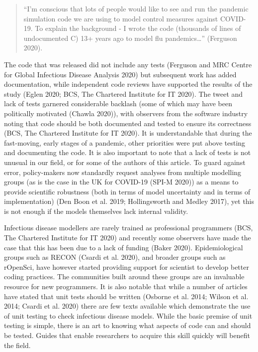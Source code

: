 \documentclass[
]{article}
\begin{document}
\begin{quote}
``I'm conscious that lots of people would like to see and run the pandemic simulation code we are using to model control measures against COVID-19. To explain the background - I wrote the code (thousands of lines of undocumented C) 13+ years ago to model flu pandemics\ldots{}'' (Ferguson 2020).
\end{quote}

The code that was released did not include any tests (Ferguson and MRC Centre for Global Infectious Disease Analysis 2020) but subsequent work has added documentation, while independent code reviews have supported the results of the study (Eglen 2020; BCS, The Chartered Institute for IT 2020).
The tweet and lack of tests garnered considerable backlash (some of which may have been politically motivated (Chawla 2020)), with observers from the software industry noting that code should be both documented and tested to ensure its correctness (BCS, The Chartered Institute for IT 2020).
It is understandable that during the fast-moving, early stages of a pandemic, other priorities were put above testing and documenting the code.
It is also important to note that a lack of tests is not unusual in our field, or for some of the authors of this article.
To guard against error, policy-makers now standardly request analyses from multiple modelling groups (as is the case in the UK for COVID-19 (SPI-M 2020)) as a means to provide scientific robustness (both in terms of model uncertainty and in terms of implementation) (Den Boon et al. 2019; Hollingsworth and Medley 2017), yet this is not enough if the models themselves lack internal validity.

Infectious disease modellers are rarely trained as professional programmers (BCS, The Chartered Institute for IT 2020) and recently some observers have made the case that this has been due to a lack of funding (Baker 2020).
Epidemiological groups such as RECON (Csardi et al. 2020), and broader groups such as rOpenSci, have however started providing support for scientist to develop better coding practices.
The communities built around these groups are an invaluable resource for new programmers.
It is also notable that while a number of articles have stated that unit tests should be written (Osborne et al. 2014; Wilson et al. 2014; Csardi et al. 2020) there are few texts available which demonstrate the use of unit testing to check infectious disease models.
While the basic premise of unit testing is simple, there is an art to knowing what aspects of code can and should be tested.
Guides that enable researchers to acquire this skill quickly will benefit the field.
\end{document}
